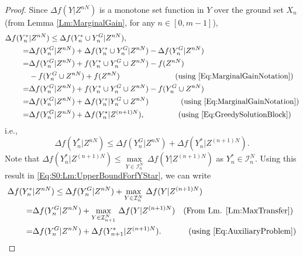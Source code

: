 \documentclass[conference]{IEEEtran}
\begin{document}
\begin{proof}
Since $\Delta f(Y \vert Z^{nN})$ is a monotone set function in $Y$ over the ground set $X_n$ (from Lemma \ref{Lm:MarginalGain}, for any $n\in[0,m-1]$), 
\begin{align}
    \Delta f(Y^*_n &\vert Z^{nN}) 
    \leq \Delta f(Y^*_n\cup Y^G_n \vert Z^{nN}), \nonumber \\
    =& \Delta f(Y^G_n \vert Z^{nN}) + \Delta f(Y^*_n\cup Y^G_n \vert Z^{nN}) - \Delta f(Y^G_n \vert Z^{nN}) \nonumber \\
    =& \Delta f(Y^G_n \vert Z^{nN}) + f(Y^*_n\cup Y^G_n\cup Z^{nN}) - f(Z^{nN}) \nonumber \\
    &- f(Y^G_n \cup Z^{nN}) + f(Z^{nN}) 
    \quad \quad \quad \quad \quad \quad \quad \, \mbox{(using \eqref{Eq:MarginalGainNotation})} \nonumber \\
    =& \Delta f(Y^G_n \vert Z^{nN}) + f(Y^*_n\cup Y^G_n\cup Z^{nN}) - f(Y^G_n \cup Z^{nN}) \nonumber \\
    =& \Delta f(Y^G_n \vert Z^{nN}) + \Delta f(Y^*_n \vert Y^G_n \cup Z^{nN}) 
    \quad \quad \quad \quad \, \mbox{(using \eqref{Eq:MarginalGainNotation})}  \nonumber \\
    =& \Delta f(Y^G_n \vert Z^{nN}) + \Delta f(Y^*_n \vert Z^{(n+1)N}), \quad \quad \quad \quad \ \mbox{(using \eqref{Eq:GreedySolutionBlock})} \nonumber
\end{align}
i.e., 
\begin{equation}\label{Eq:S0:Lm:UpperBoundForfYStar}
\Delta f(Y^*_n \vert Z^{nN}) \leq \Delta f(Y^G_n \vert Z^{nN}) + \Delta f(Y^*_n \vert Z^{(n+1)N}).   
\end{equation}
Note that $\Delta f(Y^*_n \vert Z^{(n+1)N}) \leq \underset{Y \in \mathcal{I}^N_{n}}{\max}\ \Delta f(Y \vert Z^{(n+1)N})$ as $Y^*_n \in \mathcal{I}^N_n$. Using this result in \eqref{Eq:S0:Lm:UpperBoundForfYStar}, we can write
\begin{align}
    \Delta f(Y^*_n &\vert Z^{nN}) 
    \leq \Delta f(Y^G_n \vert Z^{nN}) + \underset{Y \in \mathcal{I}^N_{n}}{\max}\ \Delta f(Y \vert Z^{(n+1)N}) \nonumber\\
    =& \Delta f(Y^G_n \vert Z^{nN}) + \underset{Y \in \mathcal{I}^N_{n+1}}{\max}\ \Delta f(Y \vert Z^{(n+1)N}) 
    \quad \mbox{(From Lm. \ref{Lm:MaxTransfer})} \nonumber\\
    =& \Delta f(Y^G_n \vert Z^{nN}) + \Delta f(Y^*_{n+1} \vert Z^{(n+1)N}). 
    \quad \quad \quad \ \mbox{(using \eqref{Eq:AuxiliaryProblem})} \nonumber
\end{align}



\end{proof}
\end{document}
